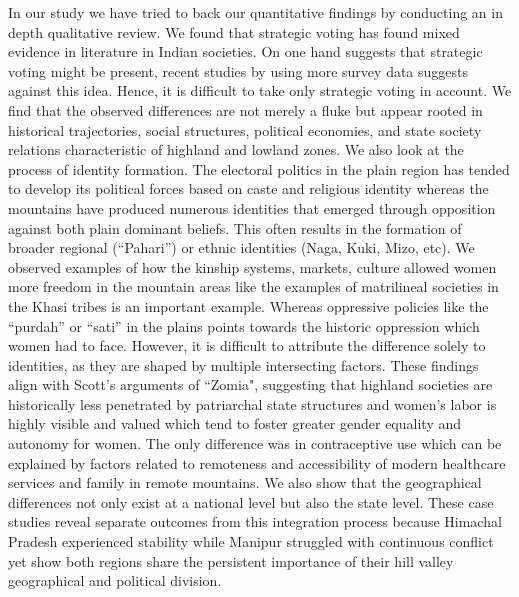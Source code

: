 \begin{sloppypar}
In our study we have tried to back our quantitative findings by conducting an in depth qualitative review. We found that strategic voting has found mixed evidence in literature in Indian societies. On one hand \cite{choi2009strategic} suggests that strategic voting might be present, recent studies by \cite{ziegfeld2021accounts} using more survey data  suggests against this idea. Hence, it is difficult to take only strategic voting in account. We find that the observed differences are not merely a fluke but appear rooted in  historical trajectories, social structures, political economies, and state society relations characteristic of highland and lowland zones.  We also look at the process of identity formation. The electoral politics in the plain region has tended to develop its political forces based on caste and religious identity whereas the mountains have produced numerous identities that emerged through opposition against both plain dominant beliefs. This often results in the formation of broader regional (``Pahari'') or ethnic identities (Naga, Kuki, Mizo, etc). We observed examples of how the kinship systems, markets, culture allowed women more freedom in the mountain areas like the examples of matrilineal societies in the Khasi tribes is an important example. Whereas oppressive policies like the ``purdah'' or ``sati'' in the plains points towards the historic oppression which women had to face. However, it is difficult to attribute the difference solely to identities, as they are shaped by multiple intersecting factors.  These findings align with Scott's arguments of  ``Zomia", suggesting that highland societies are historically less penetrated by patriarchal state structures and women's labor is highly visible and valued which tend to foster greater gender equality and autonomy for women. The only difference was in contraceptive use which can be explained by factors related to remoteness and accessibility of modern healthcare services and family in remote mountains. We also show that the geographical differences  not only exist at a national level but also the state level. These case studies reveal separate outcomes from this integration process because Himachal Pradesh experienced stability while Manipur struggled with continuous conflict yet show both regions share the persistent importance of their hill valley geographical and political division.


\end{sloppypar}
